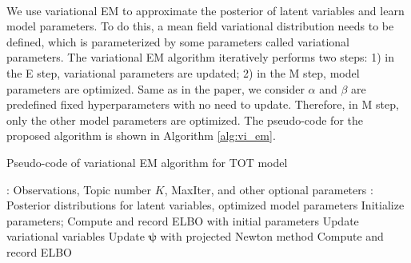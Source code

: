 \documentclass{article}
\newcommand{\psiv       }{\boldsymbol \psi       }
\begin{document}
\noindent{}\\

We use variational EM to approximate the posterior of latent variables and learn model parameters. To do this, a mean field variational distribution needs to be defined, which is parameterized by some parameters called variational parameters. The variational EM algorithm iteratively performs two steps: 1) in the E step, variational parameters are updated; 2) in the M step, model parameters are optimized. Same as in the paper, we consider $\alpha$ and $\beta$ are predefined fixed hyperparameters with no need to update. Therefore, in M step, only the other model parameters are optimized. The pseudo-code for the proposed algorithm is shown in Algorithm \ref{alg:vi_em}.

\begin{algorithm}[H]
    \centering
    \caption{Pseudo-code of variational EM algorithm for TOT model}
    \label{alg:vi_em}
  \begin{algorithmic}[1]
	: Observations, Topic number $K$, MaxIter, and other optional parameters
	: Posterior distributions for latent variables, optimized model parameters
	\State Initialize parameters;
	\State Compute and record ELBO with initial parameters
    \State Update variational variables 
    \State Update $\psiv$ with projected Newton method 
    \State Compute and record ELBO	
\EndFor
\end{algorithmic}
\end{algorithm}
\end{document}

